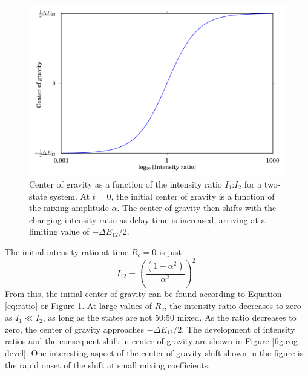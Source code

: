 \documentclass[12pt]{mitthesis}
\begin{document}
\begin{figure}
  \caption{Center of gravity as a function of the intensity ratio
    $I_1$:$I_2$ for a two-state system.  At $t=0$, the initial center
    of gravity is a function of the mixing amplitude $\alpha$.  The
    center of gravity then shifts with the changing intensity ratio as
    delay time is increased, arriving at a limiting value of $-\Delta
    E_{12}/2$.}
  \label{fig:ratio}
  \centering
  \includegraphics[width=6in]{cog-from-ratio.png}
\end{figure}

The initial intensity ratio at time $R_c=0$ is just
\begin{equation}
  I_{12} = 
  \left(
    \frac{(1 - \alpha^2)}{\alpha^2}
  \right)^2.
\end{equation}
From this, the initial center of gravity can be found according to
Equation \ref{eq:ratio} or Figure \ref{fig:ratio}.  At large values of
$R_c$, the intensity ratio decreases to zero as $I_1 \ll I_2$, as long
as the states are not 50:50 mixed.  As the ratio decreases to zero,
the center of gravity approaches $-\Delta E_{12} / 2$.  The
development of intensity ratios and the consequent shift in center of
gravity are shown in Figure \ref{fig:cog-devel}.  One interesting
aspect of the center of gravity shift shown in the figure is the rapid
onset of the shift at small mixing coefficients.  
\end{document}
